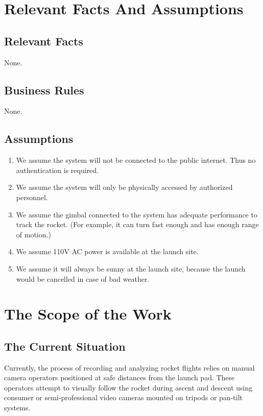 \documentclass[12pt]{article}
\begin{document}
\section{Relevant Facts And Assumptions}
\subsection{Relevant Facts}

None.

\subsection{Business Rules}

None.

\subsection{Assumptions}

\begin{enumerate}
  \item We assume the system will not be connected to the public internet. Thus no
        authentication is required.
  \item We assume the system will only be physically accessed by authorized personnel.
  \item We assume the gimbal connected to the system has adequate performance to track
        the rocket. (For example, it can turn fast enough and has enough range of
        motion.)
  \item We assume 110V AC power is available at the launch site.
  \item We assume it will always be sunny at the launch site, because the launch would
        be cancelled in case of bad weather.
\end{enumerate}

\section{The Scope of the Work}
\subsection{The Current Situation}

Currently, the process of recording and analyzing rocket flights relies on
manual camera operators positioned at safe distances from the launch pad. These
operators attempt to visually follow the rocket during ascent and descent using
consumer or semi-professional video cameras mounted on tripods or pan-tilt
systems.
\end{document}
